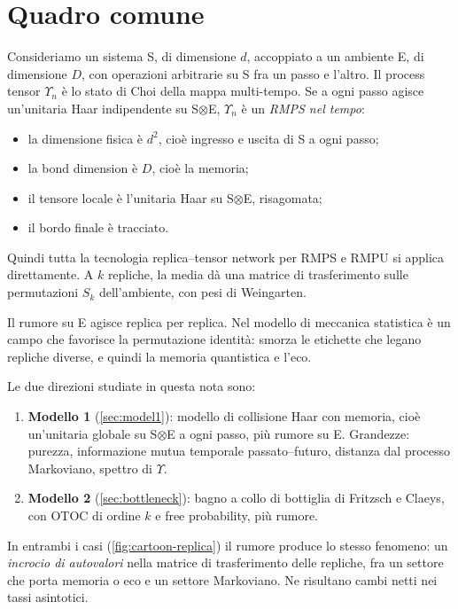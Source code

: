\section{Quadro comune}\label{sec:frame}

Consideriamo un sistema S, di dimensione $d$, accoppiato a un ambiente E, di dimensione $D$, con operazioni arbitrarie su S fra un passo e l'altro. Il process tensor $\Upsilon_n$ è lo stato di Choi della mappa multi-tempo. Se a ogni passo agisce un'unitaria Haar indipendente su S$\otimes$E, $\Upsilon_n$ è un \emph{RMPS nel tempo}:
\begin{itemize}[leftmargin=1.5em]
\item la dimensione fisica è $d^2$, cioè ingresso e uscita di S a ogni passo;
\item la bond dimension è $D$, cioè la memoria;
\item il tensore locale è l'unitaria Haar su S$\otimes$E, risagomata;
\item il bordo finale è tracciato.
\end{itemize}
Quindi tutta la tecnologia replica--tensor network per RMPS e RMPU si applica direttamente. A $k$ repliche, la media dà una matrice di trasferimento sulle permutazioni $S_k$ dell'ambiente, con pesi di Weingarten.

Il rumore su E agisce replica per replica. Nel modello di meccanica statistica è un campo che favorisce la permutazione identità: smorza le etichette che legano repliche diverse, e quindi la memoria quantistica e l'eco.

Le due direzioni studiate in questa nota sono:
\begin{enumerate}[leftmargin=2em]
\item \textbf{Modello 1} (\cref{sec:model1}): modello di collisione Haar con memoria, cioè un'unitaria globale su S$\otimes$E a ogni passo, più rumore su E. Grandezze: purezza, informazione mutua temporale passato--futuro, distanza dal processo Markoviano, spettro di $\Upsilon$.
\item \textbf{Modello 2} (\cref{sec:bottleneck}): bagno a collo di bottiglia di Fritzsch e Claeys, con OTOC di ordine $k$ e free probability, più rumore.
\end{enumerate}
\CartoonReplica
In entrambi i casi (\cref{fig:cartoon-replica}) il rumore produce lo stesso fenomeno: un \emph{incrocio di autovalori} nella matrice di trasferimento delle repliche, fra un settore che porta memoria o eco e un settore Markoviano. Ne risultano cambi netti nei tassi asintotici.
